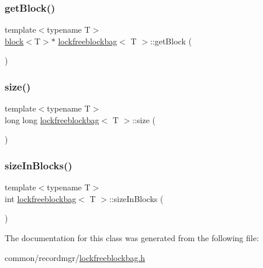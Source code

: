 \mbox{\label{classlockfreeblockbag_a3e6f92b70c0192308972fb21f3576bfc}} 
\subsubsection{\texorpdfstring{get\+Block()}{getBlock()}}
{\footnotesize\ttfamily template$<$typename T$>$ \\
\hyperlink{classblock}{block}$<$T$>$$\ast$ \hyperlink{classlockfreeblockbag}{lockfreeblockbag}$<$ T $>$\+::get\+Block (\begin{DoxyParamCaption}{ }\end{DoxyParamCaption})\hspace{0.3cm}{\ttfamily [inline]}}

\mbox{\label{classlockfreeblockbag_afb3b6cce79e57e7c46d1ca7933313ef0}} 
\subsubsection{\texorpdfstring{size()}{size()}}
{\footnotesize\ttfamily template$<$typename T$>$ \\
long long \hyperlink{classlockfreeblockbag}{lockfreeblockbag}$<$ T $>$\+::size (\begin{DoxyParamCaption}{ }\end{DoxyParamCaption})\hspace{0.3cm}{\ttfamily [inline]}}

\mbox{\label{classlockfreeblockbag_a3fe5902187ab6395bee9c4c9b2648a19}} 
\subsubsection{\texorpdfstring{size\+In\+Blocks()}{sizeInBlocks()}}
{\footnotesize\ttfamily template$<$typename T$>$ \\
int \hyperlink{classlockfreeblockbag}{lockfreeblockbag}$<$ T $>$\+::size\+In\+Blocks (\begin{DoxyParamCaption}{ }\end{DoxyParamCaption})\hspace{0.3cm}{\ttfamily [inline]}}



The documentation for this class was generated from the following file\+:\begin{DoxyCompactItemize}
\item 
common/recordmgr/\hyperlink{lockfreeblockbag_8h}{lockfreeblockbag.\+h}\end{DoxyCompactItemize}
